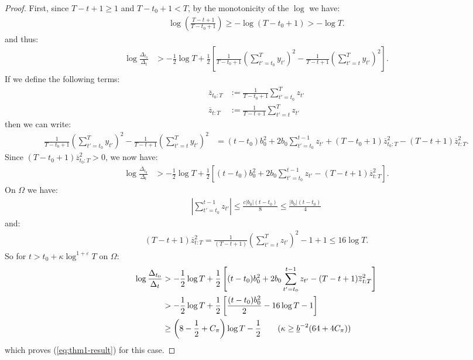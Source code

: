\begin{proof}
First, since $T-t +1\geq 1$ and $T-t_0+1 < T$, by the monotonicity of the $\log$ we have: 
\begin{align*}
    \log \left(\frac{T-t+1}{T-t_0+1}\right) \geq -\log(T-t_0+1) > -\log T.
\end{align*}
and thus:
\begin{align*}
    \log \frac{\Delta_{t_0}}{\Delta_t} &> -\frac{1}{2} \log T + \frac{1}{2} \left[\frac{1}{T-t_0+1}\left(\sum_{t'=t_0}^{T} y_{t'}\right)^2- \frac{1}{T-t+1}\left(\sum_{t'=t}^{T} y_{t'}\right)^2\right]. 
\end{align*}
If we define the following terms:
\begin{align*}
    \overline{z}_{t_0:T} &:= \frac{1}{T-t_0+1}\sum_{t'=t_0}^T z_{t'} \\
    \overline{z}_{t:T} &:= \frac{1}{T-t+1}\sum_{t'=t}^T z_{t'}
\end{align*}
then we can write:
\small
\begin{align*}
    \frac{1}{T-t_0+1}\left(\sum_{t'=t_0}^{T} y_{t'}\right)^2- \frac{1}{T-t+1}\left(\sum_{t'=t}^{T} y_{t'}\right)^2 &= (t-t_0)b_0^2 + 2b_0\sum_{t'=t_0}^{t-1}z_{t'} + (T-t_0+1) \overline{z}^2_{t_0:T} - (T-t+1)\overline{z}^2_{t:T}.
\end{align*}
\normalsize
Since $(T-t_0+1) \overline{z}^2_{t_0:T} > 0$, we now have: 
\begin{align*}
    \log \frac{\Delta_{t_0}}{\Delta_t} &> -\frac{1}{2} \log T + \frac{1}{2} \left[(t-t_0)b_0^2 + 2b_0\sum_{t'=t_0}^{t-1}z_{t'} - (T-t+1)\overline{z}^2_{t:T}\right].
\end{align*}
On $\Omega$ we have:
\begin{align*}
    \left|\sum_{t'=t_0}^{t-1}z_{t'}\right| \leq \frac{c|b_0|(t-t_0)}{8} \leq \frac{|b_0|(t-t_0)}{4}
\end{align*}
and:
\begin{align*}
    (T-t+1)\overline{z}^2_{t:T} = \frac{1}{(T-t+1)}\left(\sum_{t'=t}^T z_{t'}\right)^2 - 1 +1 \leq 16\log T.
\end{align*}
So for $t > t_0 + \kappa \log^{1+\varepsilon} T$ on $\Omega$:
\begin{align*}
    \log \frac{\Delta_{t_0}}{\Delta_t}  &> -\frac{1}{2} \log T + \frac{1}{2} \left[(t-t_0)b_0^2 + 2b_0\sum_{t'=t_0}^{t-1}z_{t'} - (T-t+1)\overline{z}^2_{t:T}\right]\\
    &> -\frac{1}{2} \log T + \frac{1}{2} \left[\frac{(t-t_0)b_0^2 }{2}- 16 \log T -1\right]  \\
    &\geq \left(8 - \frac{1}{2} + C_\pi\right) \log T - \frac{1}{2} \tag{$\kappa \geq \underline{b}^{-2}(64 + 4 C_\pi)$}
\end{align*}
which proves (\ref{eq:thm1-result}) for this case.


\end{proof}
